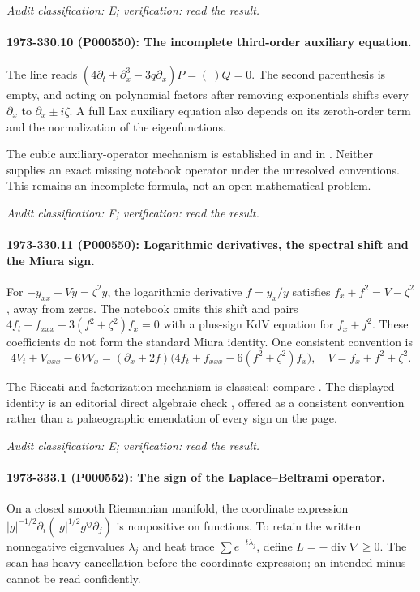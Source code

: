 \emph{Audit classification: E; verification: read the result.}

\paragraph{1973-330.10 (P000550): The incomplete third-order auxiliary equation.}
The line reads \((4\partial_t+\partial_x^3-3q\partial_x)P=(\ )Q=0\). The second parenthesis is empty, and acting on polynomial factors after removing exponentials shifts every \(\partial_x\) to \(\partial_x\pm i\zeta\). A full Lax auxiliary equation also depends on its zeroth-order term and the normalization of the eigenfunctions.

The cubic auxiliary-operator mechanism is established in \citet{shabat1973kdv} and in \citet[\S2, equation (33)]{shabat2014interpolation}. Neither supplies an exact missing notebook operator under the unresolved conventions. This remains an incomplete formula, not an open mathematical problem.

\emph{Audit classification: F; verification: read the result.}

\paragraph{1973-330.11 (P000550): Logarithmic derivatives, the spectral shift and the Miura sign.}
For \(-y_{xx}+Vy=\zeta^2y\), the logarithmic derivative \(f=y_x/y\) satisfies \(f_x+f^2=V-\zeta^2\), away from zeros. The notebook omits this shift and pairs \(4f_t+f_{xxx}+3(f^2+\zeta^2)f_x=0\) with a plus-sign KdV equation for \(f_x+f^2\). These coefficients do not form the standard Miura identity. One consistent convention is \[4V_t+V_{xxx}-6VV_x=(\partial_x+2f)\bigl(4f_t+f_{xxx}-6(f^2+\zeta^2)f_x\bigr),\quad V=f_x+f^2+\zeta^2.\]

The Riccati and factorization mechanism is classical; compare \citet[equations (2), (18)]{shabat2014interpolation}. The displayed identity is an editorial direct algebraic check \oursComputed, offered as a consistent convention rather than a palaeographic emendation of every sign on the page.

\emph{Audit classification: E; verification: read the result.}

\paragraph{1973-333.1 (P000552): The sign of the Laplace--Beltrami operator.}
On a closed smooth Riemannian manifold, the coordinate expression \(|g|^{-1/2}\partial_i(|g|^{1/2}g^{ij}\partial_j)\) is nonpositive on functions. To retain the written nonnegative eigenvalues \(\lambda_j\) and heat trace \(\sum e^{-t\lambda_j}\), define \(L=-\operatorname{div}\nabla\ge0\). The scan has heavy cancellation before the coordinate expression; an intended minus cannot be read confidently.

